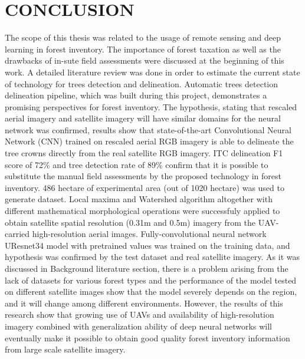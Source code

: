 \renewcommand\chaptername{}
\chapter{CONCLUSION}


The scope of this thesis was related to the usage of remote sensing and deep learning in forest inventory. The importance of forest taxation as well as the drawbacks of in-sute field assessments were discussed at the beginning of this work. A detailed literature review was done in order to estimate the current state of technology for trees detection and delineation. Automatic trees detection delineation pipeline, which was built during this project, demonstrates a promising perspectives for forest inventory. 
The hypothesis, stating that rescaled aerial imagery and satellite imagery will have similar domains for the neural network was confirmed, results show that state-of-the-art Convolutional Neural Network (\gls{CNN}) trained on rescaled aerial RGB imagery is able to delineate the tree crowns directly from the real satellite RGB imagery. \gls{ITC} delineation F1 score of 72\% and tree detection rate of 89\% confirm that it is possible to substitute the manual field assessments by the proposed technology in forest inventory. 486 hectare of experimental area (out of 1020 hectare) was used to generate dataset. Local maxima and Watershed algorithm altogether with different mathematical morphological operations were successfuly applied to obtain satellite spatial resolution (0.31m and 0.5m) imagery from the UAV-carried high-resolution aerial images. Fully-convolutional neural network UResnet34 model with pretrained values was trained on the training data, and hypothesis was confirmed by the test dataset and real satellite imagery. As it was discussed in Background literature section, there is a problem arising from the lack of datasets for various forest types and the performance of the model tested on different satellite images show that the model severely depends on the region, and it will change among different environments. However, the results of this research show that growing use of \gls{UAV}s and availability of high-resolution imagery combined with generalization ability of deep neural networks will eventually make it possible to obtain good quality forest inventory information from large scale satellite imagery.